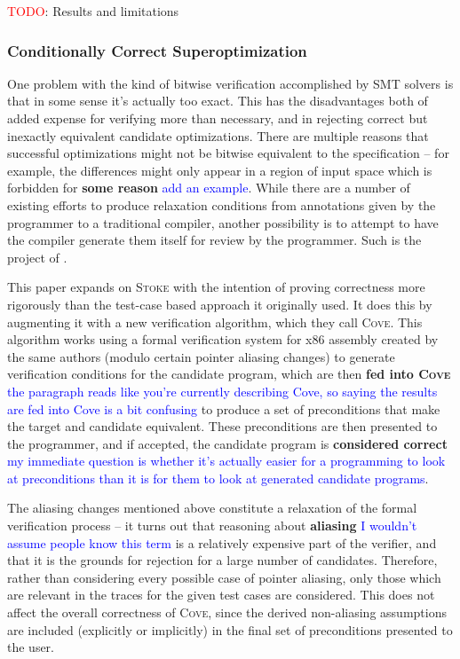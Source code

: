\documentclass[12pt,twoside]{reedthesis}
\newcommand{\red}[1]{\textcolor{red}{#1}}
\newcommand{\comment}[2]{\textbf{#1} \textcolor{blue}{#2}}
\begin{document}
\red{TODO}: Results and limitations

\subsubsection{Conditionally Correct Superoptimization}
One problem with the kind of bitwise verification accomplished by SMT solvers is that in some sense it's actually too exact.
This has the disadvantages both of added expense for verifying more than necessary, and in rejecting correct but inexactly equivalent candidate optimizations.
There are multiple reasons that successful optimizations might not be bitwise equivalent to the specification
    -- for example, the differences might only appear in a region of input space which is forbidden for \comment{some reason}{add an example}.
While there are a number of existing efforts to produce relaxation conditions from annotations given by the programmer to a traditional compiler, another possibility is to attempt to have the compiler generate them itself for review by the programmer.
Such is the project of \cite{sharma2015conditionally}.
    
This paper expands on \textsc{Stoke} with the intention of proving correctness more rigorously than the test-case based approach it originally used.
It does this by augmenting it with a new verification algorithm, which they call \textsc{Cove}.
This algorithm works using a formal verification system for x86 assembly created by the same authors \cite{sharma2013ddec} (modulo certain pointer aliasing changes) to generate verification conditions for the candidate program, which are then
    \comment{fed into \textsc{Cove}}{the paragraph reads like you're currently describing Cove, so saying the results are fed into Cove is a bit confusing}
    to produce a set of preconditions that make the target and candidate equivalent.
These preconditions are then presented to the programmer, and if accepted, the candidate program is
    \comment{considered correct}{my immediate question is whether it's actually easier for a programming to look at preconditions than it is for them to look at generated candidate programs}.
    
The aliasing changes mentioned above constitute a relaxation of the formal verification process -- it turns out that reasoning about
    \comment{aliasing}{I wouldn't assume people know this term}
    is a relatively expensive part of the verifier, and that it is the grounds for rejection for a large number of candidates.
Therefore, rather than considering every possible case of pointer aliasing, only those which are relevant in the traces for the given test cases are considered.
This does not affect the overall correctness of \textsc{Cove}, since the derived non-aliasing assumptions are included (explicitly or implicitly) in the final set of preconditions presented to the user.
    
\end{document}
